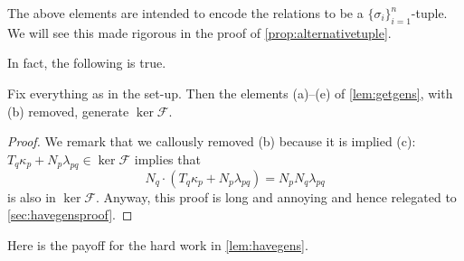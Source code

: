 \documentclass{article}
\numberwithin{equation}{section}
\begin{document}
\begin{remark}
	The above elements are intended to encode the relations to be a $\{\sigma_i\}_{i=1}^n$-tuple. We will see this made rigorous in the proof of \autoref{prop:alternativetuple}.
\end{remark}
In fact, the following is true.
\begin{lemma} \label{lem:havegens}
	Fix everything as in the set-up. Then the elements (a)--(e) of \autoref{lem:getgens}, with (b) removed, generate $\ker\mathcal F$.
\end{lemma}
\begin{proof}
	We remark that we callously removed (b) because it is implied (c): $T_q\kappa_p+N_p\lambda_{pq}\in\ker\mathcal F$ implies that
	\[N_q\cdot(T_q\kappa_p+N_p\lambda_{pq})=N_pN_q\lambda_{pq}\]
	is also in $\ker\mathcal F$. Anyway, this proof is long and annoying and hence relegated to \autoref{sec:havegensproof}.
\end{proof}
Here is the payoff for the hard work in \autoref{lem:havegens}.
\propalternativetuple*
\end{document}
